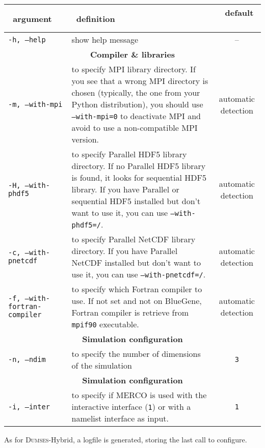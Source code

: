 \documentclass[a4paper,12pt]{article}
\begin{document}
\begin{table}[h!]
  \centering
  {\footnotesize
    \begin{tabular}{l | p{} | c }
      ~\hfill argument\hfill~ & ~\hfill definition\hfill~ & ~\hfill default \hfill~ \\
      \hline
      \hline
      \texttt{-h, --help} & show help message & -- \\
      \hline
      \multicolumn{3}{c}{\normalsize \bfseries Compiler \& libraries} \\
      \hline
      \texttt{-m, --with-mpi} & to specify MPI library directory. If you see that a wrong MPI directory is chosen (typically, the one from your Python distribution), you should use \texttt{--with-mpi=0} to deactivate MPI and avoid to use a non-compatible MPI version. & automatic detection \\
      \texttt{-H, --with-phdf5} & to specify Parallel HDF5 library directory. If no Parallel HDF5 library is found, it looks for sequential HDF5 library. If you have Parallel or sequential HDF5 installed but don't want to use it, you can use \texttt{--with-phdf5=/}. & automatic detection \\
      \texttt{-c, --with-pnetcdf} & to specify Parallel NetCDF library directory. If you have Parallel NetCDF installed but don't want to use it, you can use \texttt{--with-pnetcdf=/}. & automatic detection \\
      \texttt{-f, --with-fortran-compiler} & to specify which Fortran compiler to use. If not set and not on BlueGene, Fortran compiler is retrieve from \texttt{mpif90} executable. & automatic detection \\
      \hline
      \multicolumn{3}{c}{\normalsize \bfseries Simulation configuration} \\
      \hline
      \texttt{-n, --ndim} & to specify the number of dimensions of the simulation & \texttt{3} \\
      \hline
      \multicolumn{3}{c}{\normalsize \bfseries Simulation configuration} \\
      \hline
      \texttt{-i, --inter} & to specify if MERCO is used with the interactive interface (\texttt{1}) or with a namelist interface as input. & \texttt{1} \\
      \hline
    \end{tabular}
  }
\end{table}

As for \textsc{Dumses}-Hybrid, a logfile is generated, storing the last call to configure.
\end{document}
